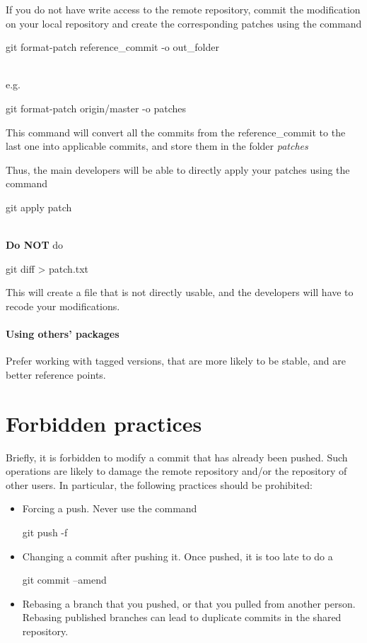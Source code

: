 If you do not have write access to the remote repository, commit the modification on your local repository and create the corresponding patches using the command 
\begin{tt}git format-patch reference\_commit -o out\_folder\end{tt}\\
e.g. 
\begin{tt}git format-patch origin/master -o patches\end{tt}

This command will convert all the commits from the reference\_commit to the last one into applicable commits,
and store them in the folder \textit{patches}

Thus, the main developers will be able to directly apply your patches using the command
\begin{tt}git apply patch\end{tt}\\

\textbf{Do NOT} do \begin{tt}git diff > patch.txt\end{tt}
This will create a file that is not directly usable, and the developers will have to recode your modifications.

\paragraph{Using others' packages}
Prefer working with tagged versions, that are more likely to be stable, and are better reference points.


\section{Forbidden practices}
Briefly, it is forbidden to modify a commit that has already been pushed. 
Such operations are likely to damage the remote repository and/or the repository of other users.
In particular, the following practices should be prohibited: 
\begin{itemize}
\item Forcing a push. Never use the command \begin{tt}{git push -f}\end{tt}
\item Changing a commit after pushing it. Once pushed, it is too late to do a \begin{tt}{git commit –amend}\end{tt}
\item Rebasing a branch that you pushed, or that you pulled from another person. 
Rebasing published branches can lead to duplicate commits in the shared repository.
\end{itemize}

